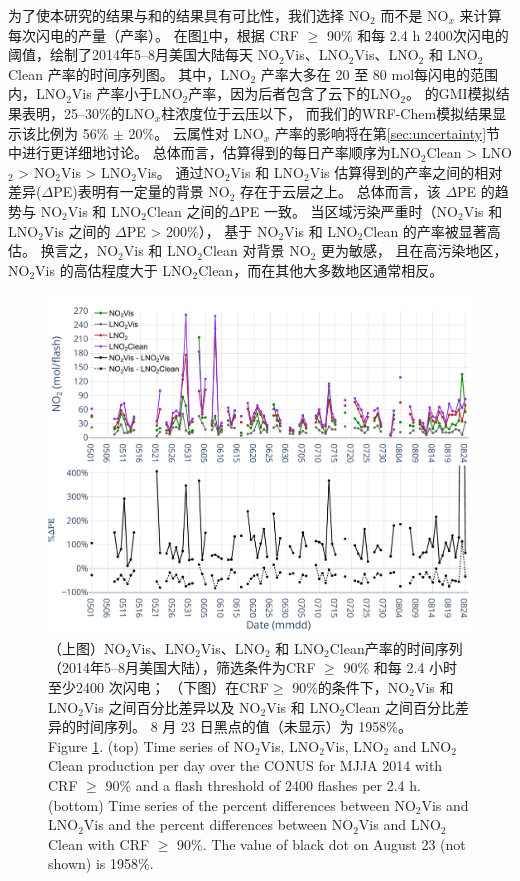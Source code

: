 为了使本研究的结果与\citet{Pickering.2016}和\citet{Lapierre.2020}的结果具有可比性，我们选择 NO$_2$  而不是 NO$_x$  来计算每次闪电的产量（产率）。
在图\ref{fig:us_pe_timeseries}中，根据 CRF $\geq$ 90\% 和每 2.4 h 2400次闪电的阈值，绘制了2014年5--8月美国大陆每天 NO$_2$Vis、LNO$_2$Vis、LNO$_2$ 和 LNO$_2$Clean 产率的时间序列图。
其中，LNO$_2$ 产率大多在 20 至 80 mol每闪电的范围内，LNO$_2$Vis 产率小于LNO$_2$产率，因为后者包含了云下的LNO$_2$。
\citet{Pickering.2016}的GMI模拟结果表明，25--30\%的LNO$_x$柱浓度位于云压以下，
而我们的WRF-Chem模拟结果显示该比例为 56\% $\pm$ 20\%。
云属性对 LNO$_x$ 产率的影响将在第\ref{sec:uncertainty}节中进行更详细地讨论。
总体而言，估算得到的每日产率顺序为LNO$_2$Clean > LNO$_2$ > NO$_2$Vis > LNO$_2$Vis。
通过NO$_2$Vis 和 LNO$_2$Vis 估算得到的产率之间的相对差异($\Delta$PE)表明有一定量的背景 NO$_2$ 存在于云层之上。
总体而言，该 $\Delta$PE 的趋势与 NO$_2$Vis 和 LNO$_2$Clean 之间的$\Delta$PE 一致。
当区域污染严重时（NO$_2$Vis 和 LNO$_2$Vis 之间的 $\Delta$PE > 200\%），
基于 NO$_2$Vis 和 LNO$_2$Clean 的产率被显著高估。
换言之，NO$_2$Vis 和 LNO$_2$Clean 对背景 NO$_2$ 更为敏感，
且在高污染地区，NO$_2$Vis 的高估程度大于 LNO$_2$Clean，而在其他大多数地区通常相反。

\begin{figure}[!htbp]
\centering
\includegraphics[width=12cm]{./figures/us_pe_timeseries.pdf}
\caption{（上图）NO$_2$Vis、LNO$_2$Vis、LNO$_2$ 和 LNO$_2$Clean产率的时间序列（2014年5--8月美国大陆），筛选条件为CRF $\geq$ 90\% 和每 2.4 小时 至少2400 次闪电；
（下图）在CRF$\geq$ 90\%的条件下，NO$_2$Vis 和 LNO$_2$Vis 之间百分比差异以及 NO$_2$Vis 和 LNO$_2$Clean 之间百分比差异的时间序列。
8 月 23 日黑点的值（未显示）为 1958\%。\\
Figure \ref{fig:us_pe_timeseries}. (top) Time series of NO$_2$Vis, LNO$_2$Vis, LNO$_2$ and LNO$_2$Clean production per day over the CONUS for MJJA 2014 with CRF $\geq$ 90\% and a flash threshold of 2400 flashes per 2.4 h.
(bottom) Time series of the percent differences between NO$_2$Vis and LNO$_2$Vis and the percent differences between NO$_2$Vis and LNO$_2$Clean with CRF $\geq$ 90\%.
The value of black dot on August 23 (not shown) is 1958\%.}
\label{fig:us_pe_timeseries}
\end{figure}

